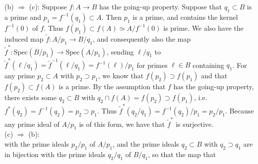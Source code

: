 \documentclass[11pt]{article}
\begin{document}
(b) $\Rightarrow$ (c): Suppose $f:A\rightarrow B$ has the going-up
property. Suppose that $q_1\subset B$ is a prime and $p_1=f^{-1}(q_1)\subset
A$. Then $p_1$ is a prime, and contains the kernel $f^{-1}(0)$ of $f$. Thus
$f(p_1)\subset f(A)\simeq A/f^{-1}(0)$ is prime. We also have the induced
map $\tilde{f}:A/p_1\rightarrow B/q_1$, and consequently also the map
$\tilde{f}^*:\text{Spec}(B/p_1)\rightarrow\text{Spec}(A/p_1)$, sending
$\ell/q_1$ to $\tilde{f}^*(\ell/q_1)=\tilde{f}^{-1}(\ell/q_1)=f^{-1}(\ell)/p_1$
for primes $\ell\in B$ containing $q_1$. For any prime $p_2\subset
A$ with $p_2\supset p_1$, we know that $f(p_2)\supset f(p_1)$ and
that $f(p_2)\subset f(A)$ is a prime. By the assumption that $f$ has
the going-up property, there exists some $q_2\subset B$ with $q_2\cap
f(A)=f(p_2)\supset f(p_1)$, i.e. $f^*(q_2)=f^{-1}(q_2)=p_2\supset p_1$. Thus
$\tilde{f}^*(q_2/q_1)=f^{-1}(q_2)/p_1=p_2/p_1$. Because any prime ideal of
$A/p_1$ is of this form, we have that $\tilde{f}^*$ is surjective.\\

(c) $\Rightarrow$ (b):      \\

%
with the prime ideals $p_2/p_1$ of $A/p_1$, and the prime ideals $q_2\subset
B$ with $q_2\supset q_1$ are in bijection with the prime ideals $q_2/q_1$
of $B/q_1$, so that the map that





     
\end{document}
